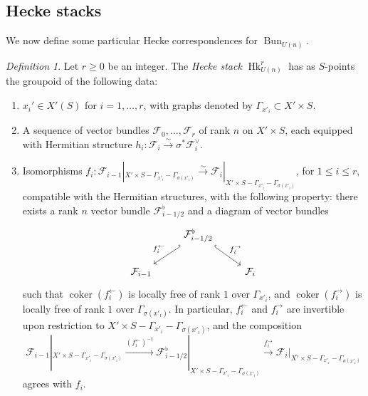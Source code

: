 \documentclass[reqno]{amsart}
\numberwithin{equation}{section}
\newcommand{\Cal}[1]{\mathcal{#1}}
\newcommand{\co}{\colon}
\DeclareMathOperator{\coker}{coker}
\DeclareMathOperator{\Bun}{Bun}
\DeclareMathOperator{\Hk}{Hk}
\theoremstyle{remark}
\newtheorem{defn}[thm]{Definition}
\numberwithin{equation}{section}
\begin{document}
\subsection{Hecke stacks} We now define some particular Hecke correspondences for $\Bun_{U(n)}$.

\begin{defn}\label{defn: Hk U(n)}
Let $r \geq 0$ be an integer. The \emph{Hecke stack} $\Hk_{U(n)}^{r}$ has as $S$-points the groupoid of the following data: 
\begin{enumerate}
\item $x_i' \in X'(S)$ for $i = 1, \ldots, r$, with graphs denoted by $\Gamma_{x'_i} \subset X' \times S$.
\item A sequence of vector bundles $\Cal{F}_0, \ldots, \Cal{F}_r$ of rank $n$ on $X' \times S$, each equipped with Hermitian structure $h_i \co \Cal{F}_i \xrightarrow{\sim} \sigma^* \Cal{F}_i^{\vee}$. 
\item Isomorphisms $f_i \co \Cal{F}_{i-1}|_{X' \times S - \Gamma_{x'_i} - \Gamma_{\sigma(x'_i)}} \xrightarrow{\sim} \Cal{F}_i|_{X' \times S - \Gamma_{x'_i}-\Gamma_{\sigma(x'_i)}}$, for $1 \leq i \leq r$, compatible with the Hermitian structures, with the following property: there exists a rank $n$ vector bundle $\Cal{F}^{\flat}_{i-1/2}$ and a diagram of vector bundles
\begin{equation}\label{eq: modification diagram 1}
\begin{tikzcd}
&\Cal{F}_{i-1/2}^{\flat} \ar[dl, "f_i^{\leftarrow}"', hook']  \ar[dr, "f_i^{\rightarrow}", hook ]  &  \\
\Cal{F}_{i-1} & & \Cal{F}_i
\end{tikzcd}
\end{equation}
such that $\coker(f_i^{\leftarrow})$ is locally free of rank $1$ over $\Gamma_{x'_i}$, and $\coker(f_i^{\rightarrow})$ is locally free of rank $1$ over $\Gamma_{\sigma(x'_i)}$. In particular, $f_i^{\leftarrow}$ and $f_i^{\rightarrow}$ are invertible upon restriction to $X' \times S - \Gamma_{x'_i}-\Gamma_{\sigma(x'_i)}$, and the composition 
\[
\Cal{F}_{i-1}|_{X' \times S - \Gamma_{x'_i}-\Gamma_{\sigma(x'_i)}} \xrightarrow{(f_i^{\leftarrow})^{-1}} \Cal{F}_{i-1/2}^{\flat}|_{X' \times S - \Gamma_{x'_i}-\Gamma_{\sigma(x'_i)}} \xrightarrow{f_i^{\rightarrow}} \Cal{F}_{i} |_{X' \times S - \Gamma_{x'_i}-\Gamma_{\sigma(x'_i)}} 
\]
agrees with $f_i$. 
\end{enumerate}


\end{defn}
\end{document}
